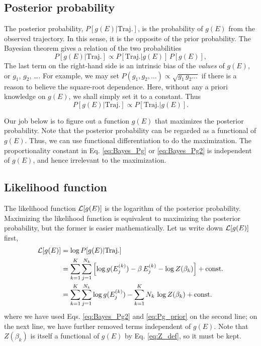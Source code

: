 \documentclass[aip,jcp,preprint,superscriptaddress]{revtex4-1}
\begin{document}
\subsection{Posterior probability}



The posterior probability,
$P[g(E)|\mathrm{Traj.}]$,
is the probability of $g(E)$
from the observed trajectory.
%
In this sense,
it is the opposite of the prior probability.
%
The Bayesian theorem
gives a relation of the two probabilities
%
\begin{equation}
  P[g(E)|\mathrm{Traj.}]
\propto
  P[\mathrm{Traj.}|g(E)]
  \,
  P[g(E)],
\label{eq:Bayes_Pg}
\end{equation}
%
The last term
on the right-hand side
is an intrinsic bias
of the \emph{values} of $g(E)$,
or $g_1$, $g_2$, \dots.
%
For example,
we may set
$P(g_1, g_2, \dots) \propto \sqrt{ g_1 \, g_2 \dots }$
if there is a reason to believe the square-root dependence.
%
Here,
without any a priori knowledge on $g(E)$,
we shall simply set it to a constant.
%
Thus
\begin{equation}
  P[g(E)|\mathrm{Traj.}]
\propto
  P[\mathrm{Traj.}|g(E)].
\label{eq:Bayes_Pg2}
\end{equation}


Our job below is to figure out a function $g(E)$
that maximizes the posterior probability.
%
Note that the posterior probability can be
regarded as a functional of $g(E)$.
%
Thus, we can use functional differentiation
to do the maximization.
%
The proportionality constant
in Eq. \eqref{eq:Bayes_Pg}
or \eqref{eq:Bayes_Pg2}
is independent of $g(E)$,
and hence irrelevant to the maximization.




\subsection{Likelihood function}



The likelihood function $\mathcal{L}[g(E)]$
is the logarithm of the posterior probability.
%
Maximizing the likelihood function
is equivalent to maximizing the posterior probability,
but the former is easier mathematically.
%
Let us write down $\mathcal{L}[g(E)]$ first,
%
\begin{align}
\mathcal{L}[g(E)]
&=
\log P[g(E)|\mathrm{Traj.}]
\notag \\
&=
\sum_{k = 1}^K
\sum_{j = 1}^{N_k}
  \left[
  \log g( E^{(k)}_j )
  -\beta \, E^{(k)}_j
  - \log Z(\beta_k)
\right]
+\mathrm{const.}
\notag \\
&=
\sum_{k = 1}^K
\sum_{j = 1}^{N_k}
\log g( E^{(k)}_j )
-
\sum_{k = 1}^K
N_k \,
\log Z(\beta_k)
+\mathrm{const.}
\end{align}
where
we have used Eqs. \eqref{eq:Bayes_Pg2}
and \eqref{eq:Pg_prior}
on the second line;
on the next line,
we have further removed
terms independent of $g(E)$.
%
Note that
$Z(\beta_k)$ is
itself a functional of $g(E)$
by Eq. \eqref{eq:Z_def},
so it must be kept.
\end{document}
